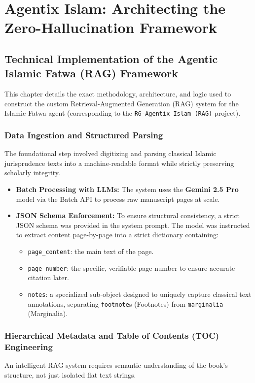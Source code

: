 \chapter{Agentix Islam: Architecting the Zero-Hallucination Framework}
\label{chap:Agentix_Islam:_Architecting_the_Zero-Hallucination_Framework}

\section{Technical Implementation of the Agentic Islamic Fatwa (RAG) Framework}

This chapter details the exact methodology, architecture, and logic used to construct the custom Retrieval-Augmented Generation (RAG) system for the Islamic Fatwa agent (corresponding to the \texttt{R6-Agentix Islam (RAG)} project).

\subsection{Data Ingestion and Structured Parsing}
The foundational step involved digitizing and parsing classical Islamic jurisprudence texts into a machine-readable format while strictly preserving scholarly integrity.

\begin{itemize}
    \item \textbf{Batch Processing with LLMs:} The system uses the \textbf{Gemini 2.5 Pro} model via the Batch API to process raw manuscript pages at scale.
    \item \textbf{JSON Schema Enforcement:} To ensure structural consistency, a strict JSON schema was provided in the system prompt. The model was instructed to extract content page-by-page into a strict dictionary containing:
    \begin{itemize}
        \item \texttt{page\_content}: the main text of the page.
        \item \texttt{page\_number}: the specific, verifiable page number to ensure accurate citation later.
        \item \texttt{notes}: a specialized sub-object designed to uniquely capture classical text annotations, separating \texttt{footnote}s (Footnotes) from \texttt{marginalia} (Marginalia).
    \end{itemize}
\end{itemize}


\subsection{Hierarchical Metadata and Table of Contents (TOC) Engineering}
An intelligent RAG system requires semantic understanding of the book's structure, not just isolated flat text strings.

